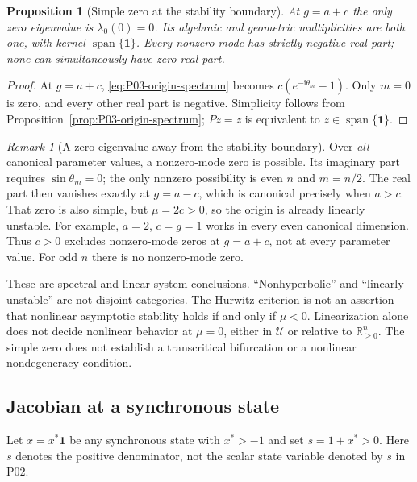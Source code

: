 \documentclass[11pt]{article}
\newcommand{\R}{\mathbb{R}}
\newcommand{\one}{\mathbf{1}}
\newcommand{\ii}{\mathrm{i}}
\newcommand{\Orth}{\R_{\geq 0}^{n}}
\newcommand{\Domain}{\mathcal{U}}
\newtheorem{proposition}[theorem]{Proposition}
\theoremstyle{definition}
\theoremstyle{remark}
\newtheorem{remark}[theorem]{Remark}
\begin{document}
\begin{proposition}[Simple zero at the stability boundary]
\label{prop:P03-boundary}
At $g=a+c$ the only zero eigenvalue is $\lambda_0(0)=0$.
Its algebraic and geometric multiplicities are both one, with
kernel $\operatorname{span}\{\one\}$. Every nonzero mode has
strictly negative real part; none can simultaneously have zero real part.
\end{proposition}
\begin{proof}
At $g=a+c$, \eqref{eq:P03-origin-spectrum} becomes
$c(e^{-\ii\theta_m}-1)$. Only $m=0$ is zero, and every other real
part is negative. Simplicity follows from Proposition~\ref{prop:P03-origin-spectrum};
$Pz=z$ is equivalent to $z\in\operatorname{span}\{\one\}$.
\end{proof}

\begin{remark}[A zero eigenvalue away from the stability boundary]
\label{rem:P03-other-zero}
Over \emph{all} canonical parameter values, a nonzero-mode zero
is possible. Its imaginary part requires $\sin\theta_m=0$;
the only nonzero possibility is even $n$ and $m=n/2$.
The real part then vanishes exactly at $g=a-c$, which is
canonical precisely when $a>c$. That zero is also simple, but
$\mu=2c>0$, so the origin is already linearly unstable. For example,
$a=2$, $c=g=1$ works in every even canonical dimension.
Thus $c>0$ excludes nonzero-mode zeros at $g=a+c$, not at every
parameter value. For odd $n$ there is no nonzero-mode zero.
\end{remark}

These are spectral and linear-system conclusions. ``Nonhyperbolic''
and ``linearly unstable'' are not disjoint categories. The Hurwitz
criterion is not an assertion that nonlinear asymptotic stability
holds if and only if $\mu<0$. Linearization alone does not decide
nonlinear behavior at $\mu=0$, either in $\Domain$ or relative to
$\Orth$. The simple zero does not establish a transcritical
bifurcation or a nonlinear nondegeneracy condition.

\subsection{Jacobian at a synchronous state}
\label{slot:P03-3}
Let $x=x^*\one$ be any synchronous state with $x^*>-1$ and set
$s=1+x^*>0$. Here $s$ denotes the positive denominator, not the
scalar state variable denoted by $s$ in P02.
\end{document}
